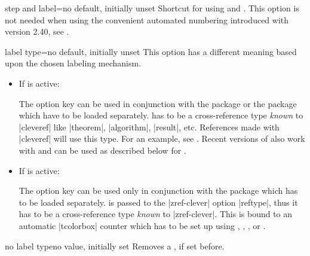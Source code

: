 \begin{docTcbKey}{step and label}{=}{no default, initially unset}
Shortcut for using  and . This option is not needed when
using the convenient automated numbering introduced with version 2.40,
see .
\end{docTcbKey}


\begin{docTcbKey}[][doc updated=2024-10-22]{label type}{=}{no default, initially unset}
This option has a different meaning based upon the chosen labeling mechanism.
\begin{itemize}
\item If  is active:\par
  The option key  can be used in conjunction with the  package
  \cite{cubitt:2018a} or the  package \cite{barros:zref-clever}
  which have to be loaded separately.
   has to be a cross-reference type \emph{known} to |cleveref|
  like |theorem|, |algorithm|, |result|, etc. References made with |cleveref|
  will use this type. For an example, see .
  Recent versions of  also work with 
  and  can be used as described below for .
\item If  is active:\par
  The option key  can be used only in conjunction with the
   package \cite{barros:zref-clever}
  which has to be loaded separately.
   is passed to the |zref-clever| option |reftype|, thus it has to
  be a cross-reference type \emph{known} to |zref-clever|.
  This  is bound to an automatic |tcolorbox| counter which has to be set up using
  ,
  ,
  , or
  .
\end{itemize}
\end{docTcbKey}


\begin{docTcbKey}[][doc updated=2023-02-09]{no label type}{}{no value, initially set}
Removes a , if set before.
\end{docTcbKey}



